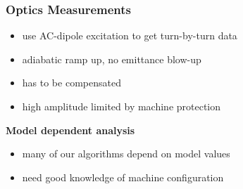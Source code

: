 \documentclass[4pt,usenames,dvipsnames,aspectratio=169,table]{beamer}
\begin{document}
\begin{frame}
    \frametitle{Optics Measurements}

    \begin{minipage}{0.55\linewidth}

            \footnotesize
        \begin{itemize}
        \item use AC-dipole excitation to get turn-by-turn data
        \item adiabatic ramp up, no emittance blow-up
        \item has to be compensated
        \item high amplitude limited by machine protection
        \end{itemize} 
        \normalsize
    \end{minipage}
    \begin{minipage}[b]{0.44\linewidth}
        \textbf{Model dependent analysis}\\[0.5em]
        \small
        \begin{itemize}
            \item many of our algorithms depend on model values
            \item need good knowledge of machine configuration
        \end{itemize}
        \normalsize
    \end{minipage}
\end{frame}
\end{document}
